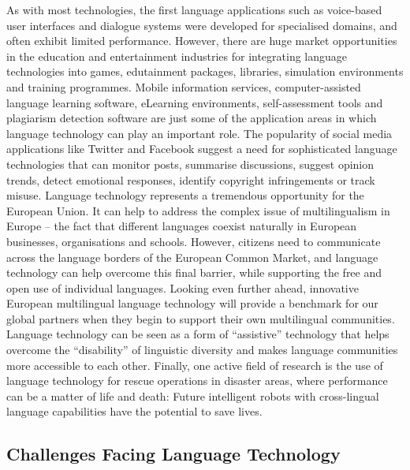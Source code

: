 \begin{multicols}{2}
As with most technologies, the first language applications such as voice-based user interfaces and dialogue systems were developed for specialised domains, and often exhibit limited performance. However, there are huge market opportunities in the education and entertainment industries for integrating language technologies into games, edutainment packages, libraries, simulation environments and training programmes. Mobile information services, computer-assisted language learning software, eLearning environments, self-assessment tools and plagiarism detection software are just some of the application areas in which language technology can play an important role. The popularity of social media applications like Twitter and Facebook suggest a need for sophisticated language technologies that can monitor posts, summarise discussions, suggest opinion trends, detect emotional responses, identify copyright infringements or track misuse.
Language technology represents a tremendous opportunity for the European Union. It can help to address the complex issue of multilingualism in Europe -- the fact that different languages coexist naturally in European businesses, organisations and schools. However, citizens need to communicate across the language borders of the European Common Market, and language technology can help overcome this final barrier, while supporting the free and open use of individual languages. Looking even further ahead, innovative European multilingual language technology will provide a benchmark for our global partners when they begin to support their own multilingual communities. Language technology can be seen as a form of “assistive” technology that helps overcome the “disability” of linguistic diversity and makes language communities more accessible to each other. Finally, one active field of research is the use of language technology for rescue operations in disaster areas, where performance can be a matter of life and death: Future intelligent robots with cross-lingual language capabilities have the potential to save lives.

\subsection{Challenges Facing Language Technology}


\end{multicols}
